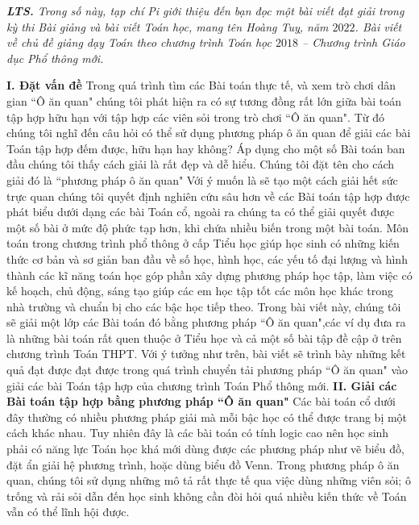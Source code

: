 	\textit{\textbf{\color{toancuabi}LTS.} Trong số này, tạp chí Pi giới thiệu đến bạn đọc một bài viết đạt giải trong kỳ thi Bài giảng và bài viết Toán học, mang tên Hoàng Tuỵ, năm $2022$. Bài viết về chủ đề giảng dạy Toán theo chương trình Toán học $2018$ -- Chương trình Giáo dục Phổ thông mới.}
\begin{multicols}{2}
	\textbf{\color{toancuabi}I.	Đặt vấn đề}
	\vskip 0.1cm
	Trong quá trình tìm các Bài toán thực tế, và xem trò chơi dân gian ``Ô ăn quan" chúng tôi phát hiện ra có sự tương đồng rất lớn giữa bài toán tập hợp hữu hạn với tập hợp các viên sỏi trong trò chơi ``Ô ăn quan". Từ đó chúng tôi nghĩ đến câu hỏi có thể sử dụng phương pháp ô ăn quan để giải các bài Toán tập hợp đếm được, hữu hạn hay không? Áp dụng cho một số Bài toán ban đầu chúng tôi thấy cách giải là rất đẹp và dễ hiểu. Chúng tôi đặt tên cho cách giải đó là ``phương pháp ô ăn quan"
	\vskip 0.1cm
	Với ý muốn là sẽ tạo một cách giải hết sức trực quan chúng tôi quyết định nghiên cứu sâu hơn về các Bài toán tập hợp được phát biểu dưới dạng các bài Toán cổ, ngoài ra chúng ta có thể giải quyết được một số bài ở mức độ phức tạp hơn, khi chứa nhiều biến trong một bài toán.
	\vskip 0.1cm
	Môn toán trong chương trình phổ thông ở cấp Tiểu học giúp học sinh có những kiến thức cơ bản và sơ giản ban đầu về số học, hình học, các yếu tố đại lượng và hình thành các kĩ năng toán học góp phần xây dựng phương pháp học tập, làm việc có kế hoạch, chủ động, sáng tạo giúp các em học tập tốt các môn học khác trong nhà trường và chuẩn bị cho các bậc học tiếp theo. Trong bài viết này, chúng tôi sẽ giải một lớp các Bài toán đó bằng phương pháp ``Ô ăn quan",các ví dụ đưa ra là những bài toán rất quen thuộc ở Tiểu học và cả một số bài tập đề cập ở trên chương trình Toán THPT.
	\vskip 0.1cm
	Với ý tưởng như trên, bài viết sẽ trình bày những kết quả đạt được đạt được trong quá trình chuyển tải phương pháp ``Ô ăn quan" vào giải các bài Toán tập hợp của chương trình Toán Phổ thông mới.
	\vskip 0.1cm
	\textbf{\color{toancuabi}II.	Giải các Bài toán tập hợp bằng phương pháp ``Ô ăn quan"}
	\vskip 0.1cm
	Các bài toán cổ dưới đây thường có nhiều phương pháp giải mà mỗi bậc học có thể được trang bị một cách khác nhau. Tuy nhiên đây là các bài toán có tính logic cao nên học sinh phải có năng lực Toán học khá mới dùng được các phương pháp như vẽ biểu đồ, đặt ẩn giải hệ phương trình, hoặc dùng biểu đồ Venn. Trong phương pháp ô ăn quan, chúng tôi sử dụng những mô tả rất thực tế qua việc dùng những viên sỏi; ô trống và rải sỏi dẫn đến học sinh không cần đòi hỏi quá nhiều kiến thức về Toán vẫn có thể lĩnh hội được.

\end{multicols}
